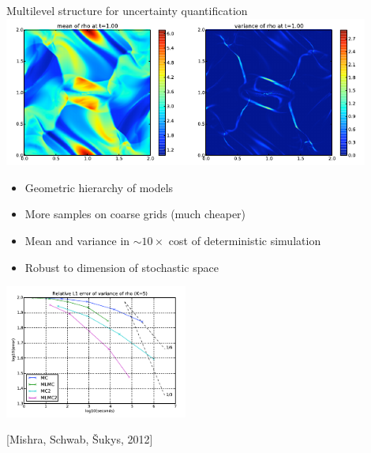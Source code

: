 \begin{frame}{Multilevel structure for uncertainty quantification}
  \centering
  \includegraphics[width=0.9\textwidth]{figures/MG/MishraSchwabSukys2012OrszagTang}
  \begin{multicols}{2}
    \begin{itemize}\small
    \item Geometric hierarchy of models
    \item More samples on coarse grids (much cheaper)
    \item Mean and variance in $\sim 10\times$ cost of deterministic simulation
    \item Robust to dimension of stochastic space
    \end{itemize}
    \includegraphics[width=0.45\textwidth]{figures/MG/MishraSchwabSukys2012OrszagTangTimeVariance}
  \end{multicols}
  {\scriptsize [Mishra, Schwab, {\v{S}}ukys, 2012]}
\end{frame}
